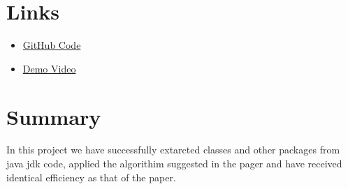 \documentclass{article}
\begin{document}
\section{Links}

\begin{itemize}
    \item \href{https://github.com/bojjam1/Assignments}{GitHub Code}
    \item \href{https://drive.google.com/file/d/1rmtP1HgzlxNoUydJNMuBLonglkQYOysS/view?usp=sharing}{Demo Video}
\end{itemize}


\newpage
\section{Summary}
\label{sec:summary}
In this project we have successfully extarcted classes and other packages from java jdk code, applied the algorithim suggested in the pager and have received identical efficiency as that of the paper.



\end{document}
